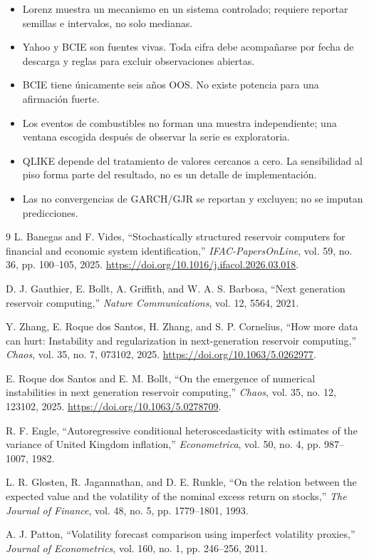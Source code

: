 \documentclass[11pt]{article}
\begin{document}
\begin{itemize}
\item Lorenz muestra un mecanismo en un sistema controlado; requiere reportar semillas e
intervalos, no solo medianas.
\item Yahoo y BCIE son fuentes vivas. Toda cifra debe acompañarse por fecha de descarga y
reglas para excluir observaciones abiertas.
\item BCIE tiene únicamente seis años OOS. No existe potencia para una afirmación fuerte.
\item Los eventos de combustibles no forman una muestra independiente; una ventana escogida
después de observar la serie es exploratoria.
\item QLIKE depende del tratamiento de valores cercanos a cero. La sensibilidad al piso forma
parte del resultado, no es un detalle de implementación.
\item Las no convergencias de GARCH/GJR se reportan y excluyen; no se imputan predicciones.
\end{itemize}

\begin{thebibliography}{9}
L. Banegas and F. Vides,
``Stochastically structured reservoir computers for financial and economic system
identification,'' \emph{IFAC-PapersOnLine}, vol. 59, no. 36, pp. 100--105, 2025.
\url{https://doi.org/10.1016/j.ifacol.2026.03.018}.

D. J. Gauthier, E. Bollt, A. Griffith, and W. A. S. Barbosa,
``Next generation reservoir computing,'' \emph{Nature Communications}, vol. 12, 5564, 2021.

Y. Zhang, E. Roque dos Santos, H. Zhang, and S. P. Cornelius,
``How more data can hurt: Instability and regularization in next-generation reservoir
computing,'' \emph{Chaos}, vol. 35, no. 7, 073102, 2025.
\url{https://doi.org/10.1063/5.0262977}.

E. Roque dos Santos and E. M. Bollt,
``On the emergence of numerical instabilities in next generation reservoir computing,''
\emph{Chaos}, vol. 35, no. 12, 123102, 2025.
\url{https://doi.org/10.1063/5.0278709}.

R. F. Engle, ``Autoregressive conditional heteroscedasticity with estimates of the variance of
United Kingdom inflation,'' \emph{Econometrica}, vol. 50, no. 4, pp. 987--1007, 1982.

L. R. Glosten, R. Jagannathan, and D. E. Runkle,
``On the relation between the expected value and the volatility of the nominal excess return
on stocks,'' \emph{The Journal of Finance}, vol. 48, no. 5, pp. 1779--1801, 1993.

A. J. Patton, ``Volatility forecast comparison using imperfect volatility proxies,''
\emph{Journal of Econometrics}, vol. 160, no. 1, pp. 246--256, 2011.
\end{thebibliography}
\end{document}
